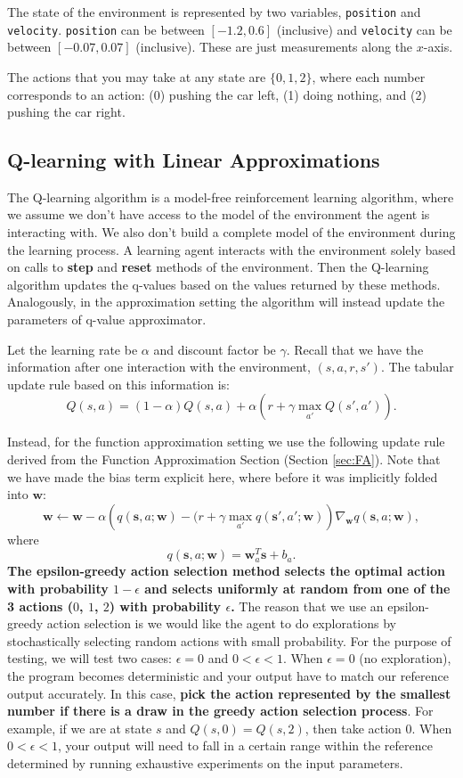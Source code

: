 \documentclass[11pt,addpoints,answers]{exam}
\newcommand{\sv}{\mathbf{s}}
\newcommand{\wv}{\mathbf{w}}
\begin{document}
The state of the environment is represented by two variables, \texttt{position} and \texttt{velocity}. \texttt{position} can be between $[-1.2, 0.6]$ (inclusive) and \texttt{velocity} can be between $[-0.07, 0.07]$ (inclusive). These are just measurements along the $x$-axis.

The actions that you may take at any state are $\{0, 1, 2\}$, where each number corresponds to an action: (0) pushing the car left, (1) doing nothing, and (2) pushing the car right.

\subsection{Q-learning with Linear Approximations}\label{subsec:q_learning}
The Q-learning algorithm is a model-free reinforcement learning algorithm, where we assume we don't have access to the model of the environment the agent is interacting with. We also don't build a complete model of the environment during the learning process. A learning agent interacts with the environment solely based on calls to \textbf{step} and \textbf{reset} methods of the environment. Then the Q-learning algorithm updates the q-values based on the values returned by these methods. Analogously, in the approximation setting the algorithm will instead update the parameters of q-value approximator.


Let the learning rate be $\alpha$ and discount factor be $\gamma$. Recall that we have the information after one interaction with the environment, $(s, a, r, s')$. The tabular update rule based on this information is: 
\[
    Q(s,a) = (1 - \alpha) Q(s, a) + \alpha \left(r + \gamma \max_{a'} Q(s', a')\right).
\]

Instead, for the function approximation setting we use the following update rule derived from the Function Approximation Section (Section \ref{sec:FA}). Note that we have made the bias term explicit here, where before it was implicitly folded into $\wv$:
\[
\wv \leftarrow \wv - \alpha \left(q(\sv, a; \wv) - (r + \gamma \max_{a'} q(\sv', a'; \wv)\right) \nabla_\wv q(\sv, a; \wv),
\]
where
\[
q(\sv,a;\wv) = \wv_a^T \sv + b_a.
\]
\textbf{The epsilon-greedy action selection method selects the optimal action with probability $1 - \epsilon$ and selects uniformly at random from one of the 3 actions ($0$, $1$, $2$) with probability $\epsilon$.} The reason that we use an epsilon-greedy action selection is we would like the agent to do explorations by stochastically selecting random actions with small probability. For the purpose of testing, we will test two cases: $\epsilon = 0$ and $0 < \epsilon < 1$. When $\epsilon = 0$ (no exploration), the program becomes deterministic and your output have to match our reference output accurately. In this case, \textbf{pick the action represented by the smallest number if there is a draw in the greedy action selection process}. For example, if we are at state $s$ and $Q(s, 0) = Q(s, 2)$, then take action $0$. When $0 < \epsilon < 1$, your output will need to fall in a certain range within the reference determined by running exhaustive experiments on the input parameters.
\end{document}
